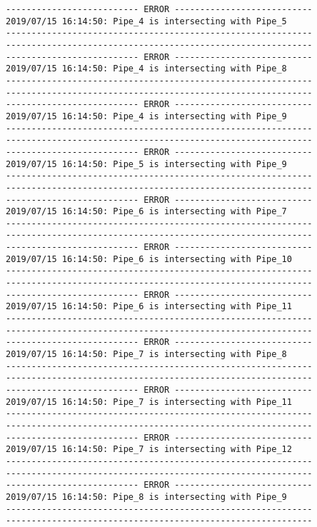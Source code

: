 \documentclass{article}
\begin{document}
{\begin{verbatim}
-------------------------- ERROR ---------------------------
2019/07/15 16:14:50: Pipe_4 is intersecting with Pipe_5
------------------------------------------------------------
------------------------------------------------------------
-------------------------- ERROR ---------------------------
2019/07/15 16:14:50: Pipe_4 is intersecting with Pipe_8
------------------------------------------------------------
------------------------------------------------------------
-------------------------- ERROR ---------------------------
2019/07/15 16:14:50: Pipe_4 is intersecting with Pipe_9
------------------------------------------------------------
------------------------------------------------------------
-------------------------- ERROR ---------------------------
2019/07/15 16:14:50: Pipe_5 is intersecting with Pipe_9
------------------------------------------------------------
------------------------------------------------------------
-------------------------- ERROR ---------------------------
2019/07/15 16:14:50: Pipe_6 is intersecting with Pipe_7
------------------------------------------------------------
------------------------------------------------------------
-------------------------- ERROR ---------------------------
2019/07/15 16:14:50: Pipe_6 is intersecting with Pipe_10
------------------------------------------------------------
------------------------------------------------------------
-------------------------- ERROR ---------------------------
2019/07/15 16:14:50: Pipe_6 is intersecting with Pipe_11
------------------------------------------------------------
------------------------------------------------------------
-------------------------- ERROR ---------------------------
2019/07/15 16:14:50: Pipe_7 is intersecting with Pipe_8
------------------------------------------------------------
------------------------------------------------------------
-------------------------- ERROR ---------------------------
2019/07/15 16:14:50: Pipe_7 is intersecting with Pipe_11
------------------------------------------------------------
------------------------------------------------------------
-------------------------- ERROR ---------------------------
2019/07/15 16:14:50: Pipe_7 is intersecting with Pipe_12
------------------------------------------------------------
------------------------------------------------------------
-------------------------- ERROR ---------------------------
2019/07/15 16:14:50: Pipe_8 is intersecting with Pipe_9
------------------------------------------------------------
------------------------------------------------------------

\end{verbatim}}
\end{document}
